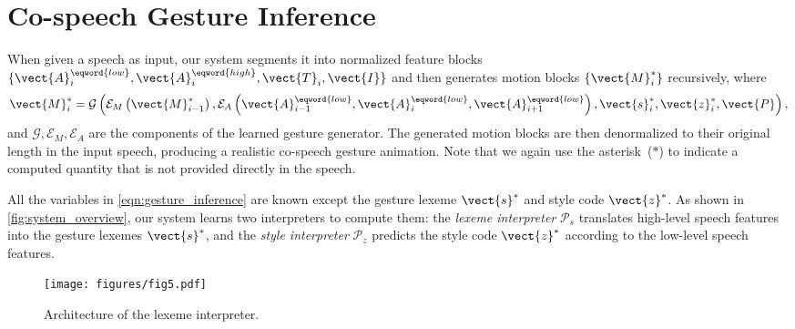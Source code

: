 \section{Co-speech Gesture Inference}
\label{sec:co-speech_gesture_inference}
When given a speech as input, our system segments it into normalized feature blocks $\{\vect{A}_i^{\eqword{low}}, \vect{A}_i^{\eqword{high}}, \vect{T}_i, \vect{I}\}$ and then generates motion blocks $\{\vect{M}_i^*\}$ recursively, where 
\begin{align}
    \vect{M}_i^* = \mathcal{G}\left(
        \mathcal{E}_M\left(\vect{M}_{i-1}^*\right), 
        \mathcal{E}_A\left(\vect{A}^{\eqword{low}}_{i-1}, \vect{A}^{\eqword{low}}_{i}, \vect{A}^{\eqword{low}}_{i+1}\right), 
        \vect{s}_i^*, \vect{z}_i^*, \vect{P}
        \right),
    \label{eqn:gesture_inference}
\end{align}
and $\mathcal{G}, \mathcal{E}_M, \mathcal{E}_A$ are the components of the learned gesture generator. The generated motion blocks are then denormalized to their original length in the input speech, producing a realistic co-speech gesture animation. Note that we again use the asterisk~($*$) to indicate a computed quantity that is not provided directly in the speech. 

All the variables in \eqn\eqref{eqn:gesture_inference} are known except the gesture lexeme $\vect{s}^*$ and style code $\vect{z}^*$. As shown in \fig\ref{fig:system_overview}, our system learns two interpreters to compute them: the \emph{lexeme interpreter} $\mathcal{P}_s$ translates high-level speech features into the gesture lexemes $\vect{s}^*$, and the \emph{style interpreter} $\mathcal{P}_z$ predicts the style code $\vect{z}^*$ according to the low-level speech features. 

\begin{figure}[t]
    \centering
    \texttt{[image: figures/fig5.pdf]}
    \caption{Architecture of the lexeme interpreter.}
    \label{fig:interpreters}
\end{figure}

